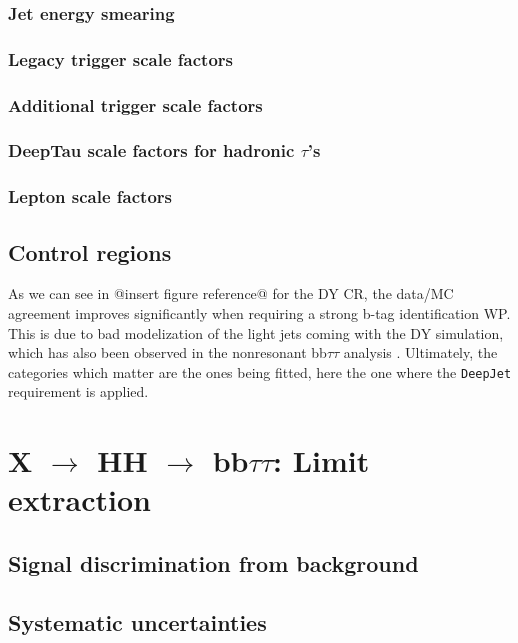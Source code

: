 \documentclass[11pt]{article}
\newcommand{\bbtt}{bb$\tau\tau$}
\newcommand{\reshhbbtt}{X $\rightarrow$ HH $\rightarrow$ bb$\tau\tau$}
\begin{document}
\subsubsection{Jet energy smearing}
\label{sec:org217daf5}
\subsubsection{Legacy trigger scale factors}
\label{sec:orgd3da46d}
\subsubsection{Additional trigger scale factors}
\label{sec:org8d4ff1f}
\subsubsection{DeepTau scale factors for hadronic \(\tau\)'s}
\label{sec:org3c8fc52}
\subsubsection{Lepton scale factors}
\label{sec:org7b2088a}

\subsection{Control regions}
\label{sec:org3e201aa}
As we can see in @insert figure reference@ for the \ac{DY} \ac{CR}, the data/MC agreement improves significantly when requiring a strong b-tag identification \ac{WP}.
This is due to bad modelization of the light jets coming with the \ac{DY} simulation, which has also been observed in the nonresonant \bbtt{} analysis \cite{higgs_bbtautau_nonres}.
Ultimately, the categories which matter are the ones being fitted, here the one where the \texttt{DeepJet} requirement is applied.


\section{\reshhbbtt{}: Limit extraction}
\label{sec:org06f24e1}
\subsection{Signal discrimination from background}
\label{sec:org0416778}
\subsection{Systematic uncertainties}
\label{sec:org7b61266}
\end{document}
